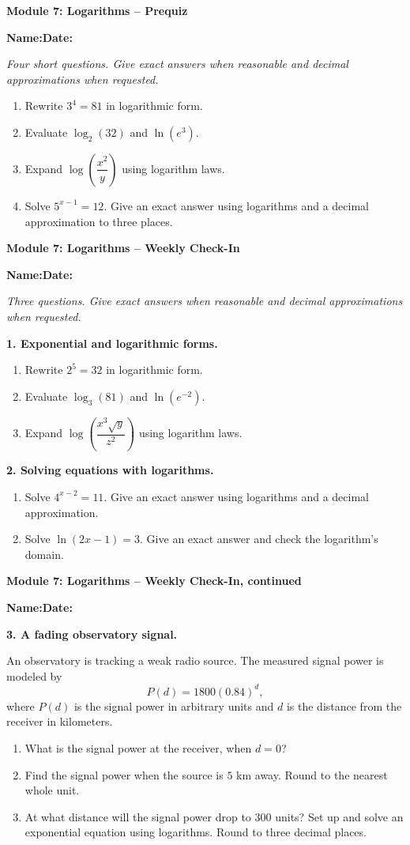 \documentclass[11pt]{article}
\newcommand{\assessmenttitle}[2]{%
  {\Large\bfseries Module #1: #2}\par\vspace{3pt}
}
\newcommand{\studentline}{%
\noindent\textbf{Name:}\hspace{2.6in}\textbf{Date:}\hspace{1.15in}\par\vspace{7pt}}
\newcommand{\directions}[1]{\textit{#1}\par\vspace{4pt}}
\newcommand{\answerblank}[1]{\vspace{#1}}
\begin{document}
\assessmenttitle{7}{Logarithms -- Prequiz}
\studentline
\directions{Four short questions. Give exact answers when reasonable and decimal approximations when requested.}
\begin{enumerate}
\item Rewrite $3^4=81$ in logarithmic form.
\answerblank{0.42in}
\item Evaluate $\log_2(32)$ and $\ln(e^3)$.
\answerblank{0.48in}
\item Expand $\log\!\left(\dfrac{x^2}{y}\right)$ using logarithm laws.
\answerblank{0.52in}
\item Solve $5^{x-1}=12$. Give an exact answer using logarithms and a decimal approximation to three places.
\answerblank{0.78in}
\end{enumerate}
\newpage

\assessmenttitle{7}{Logarithms -- Weekly Check-In}
\studentline
\directions{Three questions. Give exact answers when reasonable and decimal approximations when requested.}
\textbf{1. Exponential and logarithmic forms.}

\begin{enumerate}[label=(\alph*),leftmargin=0.35in]
\item Rewrite $2^5=32$ in logarithmic form.
\answerblank{0.36in}
\item Evaluate $\log_3(81)$ and $\ln(e^{-2})$.
\answerblank{0.45in}
\item Expand $\log\!\left(\dfrac{x^3\sqrt{y}}{z^2}\right)$ using logarithm laws.
\answerblank{0.65in}
\end{enumerate}

\textbf{2. Solving equations with logarithms.}

\begin{enumerate}[label=(\alph*),leftmargin=0.35in]
\item Solve $4^{x-2}=11$. Give an exact answer using logarithms and a decimal approximation.
\answerblank{0.78in}
\item Solve $\ln(2x-1)=3$. Give an exact answer and check the logarithm's domain.
\answerblank{0.82in}
\end{enumerate}
\newpage

\assessmenttitle{7}{Logarithms -- Weekly Check-In, continued}
\studentline
\textbf{3. A fading observatory signal.}

An observatory is tracking a weak radio source. The measured signal power is modeled by
\[
P(d)=1800(0.84)^d,
\]
where $P(d)$ is the signal power in arbitrary units and $d$ is the distance from the receiver in kilometers.
\begin{enumerate}[label=(\alph*),leftmargin=0.35in]
\item What is the signal power at the receiver, when $d=0$?
\answerblank{0.48in}
\item Find the signal power when the source is $5$ km away. Round to the nearest whole unit.
\answerblank{0.72in}
\item At what distance will the signal power drop to $300$ units? Set up and solve an exponential equation using logarithms. Round to three decimal places.
\answerblank{1.55in}
\end{enumerate}
\end{document}
